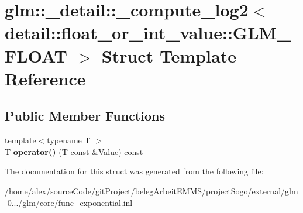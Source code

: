 \hypertarget{structglm_1_1__detail_1_1__compute__log2_3_01detail_1_1float__or__int__value_1_1GLM__FLOAT_01_4}{\section{glm\-:\-:\-\_\-detail\-:\-:\-\_\-compute\-\_\-log2$<$ detail\-:\-:float\-\_\-or\-\_\-int\-\_\-value\-:\-:G\-L\-M\-\_\-\-F\-L\-O\-A\-T $>$ Struct Template Reference}
\label{structglm_1_1__detail_1_1__compute__log2_3_01detail_1_1float__or__int__value_1_1GLM__FLOAT_01_4}
}
\subsection*{Public Member Functions}
\begin{DoxyCompactItemize}
\item 
\hypertarget{structglm_1_1__detail_1_1__compute__log2_3_01detail_1_1float__or__int__value_1_1GLM__FLOAT_01_4_a8814666ed10353997362f6fa0830ff88}{{\footnotesize template$<$typename T $>$ }\\T {\bfseries operator()} (T const \&Value) const }\label{structglm_1_1__detail_1_1__compute__log2_3_01detail_1_1float__or__int__value_1_1GLM__FLOAT_01_4_a8814666ed10353997362f6fa0830ff88}

\end{DoxyCompactItemize}


The documentation for this struct was generated from the following file\-:\begin{DoxyCompactItemize}
\item 
/home/alex/source\-Code/git\-Project/beleg\-Arbeit\-E\-M\-M\-S/project\-Sogo/external/glm-\/0.../glm/core/\hyperlink{func__exponential_8inl}{func\-\_\-exponential.\-inl}\end{DoxyCompactItemize}
